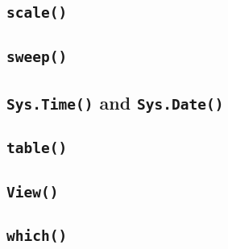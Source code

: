 \documentclass[a4paper,12pt]{article}
\begin{document}
\subsection{\texttt{scale()}}
\subsection{\texttt{sweep()}}
\subsection{\texttt{Sys.Time()} and \texttt{Sys.Date()} }
\subsection{\texttt{table()}}
\subsection{\texttt{View()}}
\subsection{\texttt{which()}}
\newpage
\end{document}
